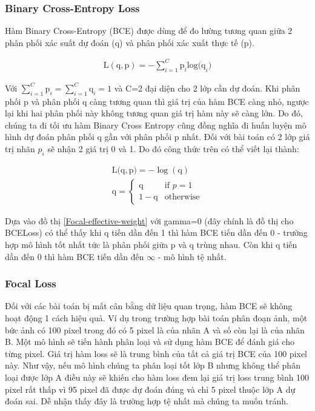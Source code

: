 \subsubsection*{Binary Cross-Entropy Loss}
Hàm Binary Cross-Entropy (BCE) được dùng để đo lường tương quan giữa 2 phân phối xác suất dự đoán (q) và phân phối xác xuất thực tế (p).

\begin{align}
    \mathrm{L(q,p)} = -\sum_{i=1}^{C} \mathrm{p}_i \mathrm{log(q}_i)
\end{align}

Với $\sum_{i=1}^{C}\mathrm{p}_i = \sum_{i=1}^{C}\mathrm{q}_i = 1$ và C=2 đại diện cho 2 lớp cần dự đoán. Khi phân phối p và phân phối q càng tương quan thì giá trị của hàm BCE càng nhỏ, ngược lại khi hai phân phối này không tương quan giá trị hàm này sẽ càng lớn. Do đó, chúng ta đi tối ưu hàm Binary Cross Entropy cũng đồng nghĩa đi huấn luyện mô hình dự đoán phân phối q gần với phân phối p nhất. Đối với bài toán có 2 lớp giá trị nhãn $p_i$ sẽ nhận 2 giá trị 0 và 1. Do đó công thức trên có thể viết lại thành: 

\begin{align}
    \mathrm{L(q, p}) = -\log(\mathrm{q}) \\
    \nonumber
    \mathrm{q} = \begin{cases} 
              \mathrm{q} & \text{if } p = 1 \\
              1-\mathrm{q} & \text{otherwise}
          \end{cases}
\end{align}

Dựa vào đồ thị \ref{Focal-effective-weight} với gamma=0 (đây chính là đồ thị cho BCELoss) có thể thấy khi $\mathrm{q}$ tiến dần đến 1 thì hàm BCE tiến dần đến 0 - trường hợp mô hình tốt nhất tức là phân phối giữa p và q trùng nhau. Còn khi $\mathrm{q}$ tiến dần đến 0 thì hàm BCE tiến dần đến $\infty$ - mô hình tệ nhất. 

\subsubsection*{Focal Loss}
Đối với các bài toán bị mất cân bằng dữ liệu quan trọng, hàm BCE sẽ không hoạt động 1 cách hiệu quả. Ví dụ trong trường hợp bài toán phân đoạn ảnh, một bức ảnh có 100 pixel trong đó có 5 pixel là của nhãn A và số còn lại là của nhãn B. Một mô hình sẽ tiến hành phân loại và sử dụng hàm BCE để đánh giá cho từng pixel. Giá trị hàm loss sẽ là trung bình của tất cả giá trị BCE của 100 pixel này.  Như vậy, nếu mô hình chúng ta phân loại tốt lớp B nhưng không thể phân loại được lớp A điều này sẽ khiến cho hàm loss đem lại giá trị loss trung bình 100 pixel rất thấp vì 95 pixel đã được dự đoán đúng và chỉ 5 pixel thuộc lớp A dự đoán sai. Dễ nhận thấy đây là trường hợp tệ nhất mà chúng ta muốn tránh.

